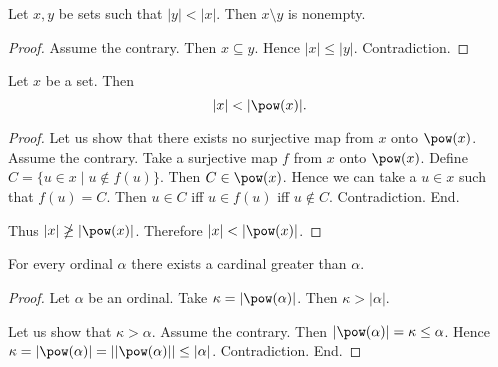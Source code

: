\documentclass[../set-theory.tex]{subfiles}
\begin{document}
  \begin{forthel}
    \begin{proposition}
      Let $x, y$ be sets such that $|y| < |x|$.
      Then $x \setminus y$ is nonempty.
    \end{proposition}
    \begin{proof}
      Assume the contrary.
      Then $x \subseteq y$.
      Hence $|x| \leq |y|$.
      Contradiction.
    \end{proof}
  \end{forthel}

  \begin{forthel}
    \begin{theorem}
      Let $x$ be a set.
      Then \[ |x| < |\pow(x)|. \]
    \end{theorem}
    \begin{proof}
      Let us show that there exists no surjective map from $x$ onto $\pow(x)$.
        Assume the contrary.
        Take a surjective map $f$ from $x$ onto $\pow(x)$.
        Define $C = \{ u \in x \mid u \notin f(u) \}$.
        Then $C \in \pow(x)$.
        Hence we can take a $u \in x$ such that $f(u) = C$.
        Then $u \in C$ iff $u \in f(u)$ iff $u \notin C$.
        Contradiction.
      End.

      Thus $|x| \ngeq |\pow(x)|$.
      Therefore $|x| < |\pow(x)|$.
    \end{proof}
  \end{forthel}

  \begin{forthel}
    \begin{theorem}
      For every ordinal $\alpha$ there exists a cardinal greater than $\alpha$.
    \end{theorem}
    \begin{proof}
      Let $\alpha$ be an ordinal.
      Take $\kappa = |\pow(\alpha)|$.
      Then $\kappa > |\alpha|$.

      Let us show that $\kappa > \alpha$.
        Assume the contrary.
        Then $|\pow(\alpha)|
          = \kappa
          \leq \alpha$.
        Hence $\kappa
          = |\pow(\alpha)|
          = ||\pow(\alpha)||
          \leq |\alpha|$.
        Contradiction.
      End.
    \end{proof}
  \end{forthel}
\end{document}
